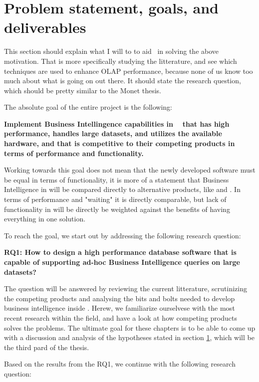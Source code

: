 \section{Problem statement, goals, and deliverables}
\label{sec:problem-statement-and-goals}
\begin{secex}
This section should explain what I will to to aid \genus~in solving the above motivation. That is more specifically studying the litterature, and see which techniques are used to enhance OLAP performance, because none of us know too much about what is going on out there. It should state the research question, which should be pretty similar to the Monet thesis.
\end{secex}

The absolute goal of the entire project is the following: 

\textbf{Implement Business Intellingence capabilities in \genusSoftware~ that has high performance, handles large datasets, and utilizes the available hardware, and that is competitive to their competing products in terms of performance and functionality.}

Working towards this goal does not mean that the newly developed software must be equal in terms of functionality, it is more of a statement that Business Intelligence in \genusSoftware will be compared directly to alternative products, like \qlikview and \tableau. In terms of performance and "waiting" it is directly comparable, but lack of functionality in \genusSoftware will be directly be weighted against the benefits of having everything in one solution.

To reach the goal, we start out by addressing the following research question:

\textbf{RQ1: How to design a high performance database software that is capable of supporting ad-hoc Business Intelligence queries on large datasets?}

The question will be answered by reviewing the current litterature, scrutinizing the competing products and analysing the bits and bolts needed to develop business intelligence inside \genusSoftware. Herew, we familiarize ourselvese with the most recent research within the field, and have a look at how competing products solves the problems. The ultimate goal for these chapters is to be able to come up with a discussion and analysis of the hypotheses stated in section \ref{sec:problem-statement-and-goals}, which will be the third pard of the thesis.

Based on the results from the RQ1, we continue with the following research question:

